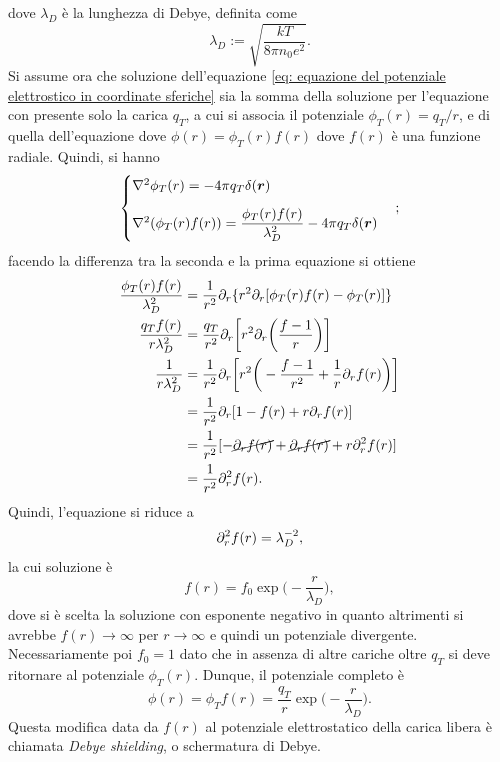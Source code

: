 dove $\lambda_D$ è la lunghezza di Debye, definita come 
\begin{equation}
\label{eq: lunghezza di Debye}
    \lambda_D := \sqrt{\frac{kT}{8\pi n_0e^2}}.
\end{equation}
Si assume ora che soluzione dell'equazione \eqref{eq: equazione del potenziale elettrostico in coordinate sferiche} sia la somma della soluzione per l'equazione con presente solo la carica $q_T$, a cui si associa il potenziale $\phi_T(r) =q_T/r$, e di quella dell'equazione dove $\phi(r) = \phi_T(r)f(r)$ dove $f(r)$ è una funzione radiale. Quindi, si hanno
\begin{equation}
    \begin{cases}
        \nabla^2\phi_T(r) = -4\pi q_T\delta(\bm{r}) \\[2ex]
        \nabla^2(\phi_T(r)f(r)) = \dfrac{\phi_T(r)f(r)}{\lambda_D^2} - 4\pi q_T\delta(\bm{r})
    \end{cases};
\end{equation}
facendo la differenza tra la seconda e la prima equazione si ottiene
\begin{equation}
    \begin{split}
        \frac{\phi_T(r)f(r)}{\lambda_D^2} &= \frac{1}{r^2}\partial_r\{r^2\partial_r[\phi_T(r)f(r) - \phi_T(r)]\} \\
        \frac{q_Tf(r)}{r\lambda_D^2} &= \frac{q_T}{r^2}\partial_r\bigg[r^2\partial_r\bigg(\frac{f - 1}{r}\bigg)\bigg] \\
        \frac{1}{r\lambda_D^2} &= \frac{1}{r^2}\partial_r\bigg[r^2\bigg(-\frac{f - 1}{r^2} + \frac{1}{r}\partial_rf(r)\bigg)\bigg] \\
        &= \frac{1}{r^2}\partial_r[1 - f(r) + r\partial_rf(r)] \\
        &= \frac{1}{r^2}[-\cancel{\partial_rf(r)} + \cancel{\partial_rf(r)} + r\partial_r^2f(r)] \\
         &= \frac{1}{r^2}\partial_r^2f(r).
    \end{split}
\end{equation}
Quindi, l'equazione si riduce a
\begin{equation}
    \partial_r^2f(r) = \lambda_D^{-2},
\end{equation}
la cui soluzione è 
\begin{equation}
    f(r) = f_0\exp{\bigg(-\frac{r}{\lambda_D}\bigg)},
\end{equation}
dove si è scelta la soluzione con esponente negativo in quanto altrimenti si avrebbe $f(r) \to \infty$ per $r \to \infty$ e quindi un potenziale divergente. Necessariamente poi $f_0 = 1$ dato che in assenza di altre cariche oltre $q_T$ si deve ritornare al potenziale $\phi_T(r)$. Dunque, il potenziale completo è
\begin{equation}
\label{eq: potenziale elettrostatico Debye shielding}
    \phi(r) = \phi_Tf(r) = \frac{q_T}{r}\exp{\bigg(-\frac{r}{\lambda_D}\bigg)}.
\end{equation}
Questa modifica data da $f(r)$ al potenziale elettrostatico della carica libera è chiamata \emph{Debye shielding}, o schermatura di Debye.

